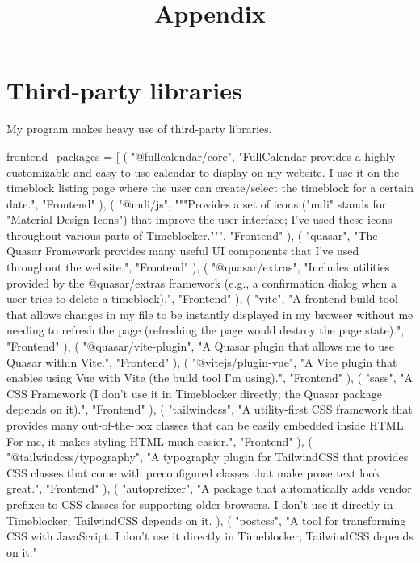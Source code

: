 \documentclass[12pt]{report}
\title{Appendix}
\begin{document}
\centerline{\textcolor{msblue}{
		\textbf{\fontsize{13}{13}\MyTitle}
	}}

\section*{Third-party libraries}
My program makes heavy use of third-party libraries.

\begin{pycode}

frontend_packages = [
	(
		"@fullcalendar/core",
		"FullCalendar provides a highly customizable and easy-to-use calendar to display on my website. I use it on the timeblock listing page where the user can create/select the timeblock for a certain date.",
		"Frontend"
	),
	(
		"@mdi/js",
		"""Provides a set of icons ("mdi" stands for "Material Design Icons") that improve the user interface; I've used these icons throughout various parts of Timeblocker.""",
		"Frontend"
	),
	(
		"quasar",
		"The Quasar Framework provides many useful UI components that I've used throughout the website.",
		"Frontend"
	),
	(
		"@quasar/extras",
		"Includes utilities provided by the @quasar/extras framework (e.g., a confirmation dialog when a user tries to delete a timeblock).",
		"Frontend"
	),
	(
		"vite",
		"A frontend build tool that allows changes in my file to be instantly displayed in my browser without me needing to refresh the page (refreshing the page would destroy the page state).",
		"Frontend"
	),
	(
		"@quasar/vite-plugin",
		"A Quasar plugin that allows me to use Quasar within Vite.",
		"Frontend"
	),
	(
		"@vitejs/plugin-vue",
		"A Vite plugin that enables using Vue with Vite (the build tool I'm using).",
		"Frontend"
	),
	(
		"sass",
		"A CSS Framework (I don't use it in Timeblocker directly; the Quasar package depends on it).",
		"Frontend"
	),
	(
		"tailwindcss",
		"A utility-first CSS framework that provides many out-of-the-box classes that can be easily embedded inside HTML. For me, it makes styling HTML much easier.",
		"Frontend"
	),
	(
		"@tailwindcss/typography",
		"A typography plugin for TailwindCSS that provides CSS classes that come with preconfigured classes that make prose text look great.",
		"Frontend"
	),
	(
		"autoprefixer",
		"A package that automatically adds vendor prefixes to CSS classes for supporting older browsers. I don't use it directly in Timeblocker; TailwindCSS depends on it.
	),
	(
		"postcss",
		"A tool for transforming CSS with JavaScript. I don't use it directly in Timeblocker; TailwindCSS depends on it."

\end{pycode}
\end{document}
